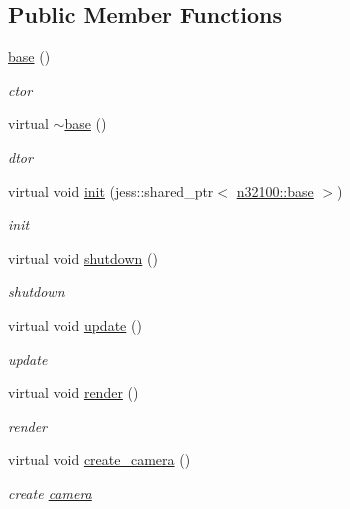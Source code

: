 \subsection*{Public Member Functions}
\begin{DoxyCompactItemize}
\item 
\hyperlink{classnebula_1_1content_1_1view_1_1admin_1_1human_1_1base_a681eda36fa571b801d5369f2834ca119}{base} ()
\begin{DoxyCompactList}\small\item\em ctor \item\end{DoxyCompactList}\item 
virtual \hyperlink{classnebula_1_1content_1_1view_1_1admin_1_1human_1_1base_a93ed0174628fa1e1cb7c08986ae7131c}{$\sim$base} ()
\begin{DoxyCompactList}\small\item\em dtor \item\end{DoxyCompactList}\item 
virtual void \hyperlink{classnebula_1_1content_1_1view_1_1admin_1_1human_1_1base_ac03c971a7f2769dfce37c70b97539768}{init} (jess::shared\_\-ptr$<$ \hyperlink{classnebula_1_1content_1_1scene_1_1admin_1_1base}{n32100::base} $>$)
\begin{DoxyCompactList}\small\item\em init \item\end{DoxyCompactList}\item 
virtual void \hyperlink{classnebula_1_1content_1_1view_1_1admin_1_1human_1_1base_a0d6c670702266530dd1397debb8e4b8a}{shutdown} ()
\begin{DoxyCompactList}\small\item\em shutdown \item\end{DoxyCompactList}\item 
virtual void \hyperlink{classnebula_1_1content_1_1view_1_1admin_1_1human_1_1base_a6ffdf9e2329934997591da7fedb75b6f}{update} ()
\begin{DoxyCompactList}\small\item\em update \item\end{DoxyCompactList}\item 
virtual void \hyperlink{classnebula_1_1content_1_1view_1_1admin_1_1human_1_1base_a9ac7c00ce4bc7f8a8de608ef2092fcd0}{render} ()
\begin{DoxyCompactList}\small\item\em render \item\end{DoxyCompactList}\item 
virtual void \hyperlink{classnebula_1_1content_1_1view_1_1admin_1_1human_1_1base_a3cfdc93ec0d6d15b65cbd82f4c49e61f}{create\_\-camera} ()
\begin{DoxyCompactList}\small\item\em create \hyperlink{classnebula_1_1content_1_1camera}{camera} \item\end{DoxyCompactList}\end{DoxyCompactItemize}



